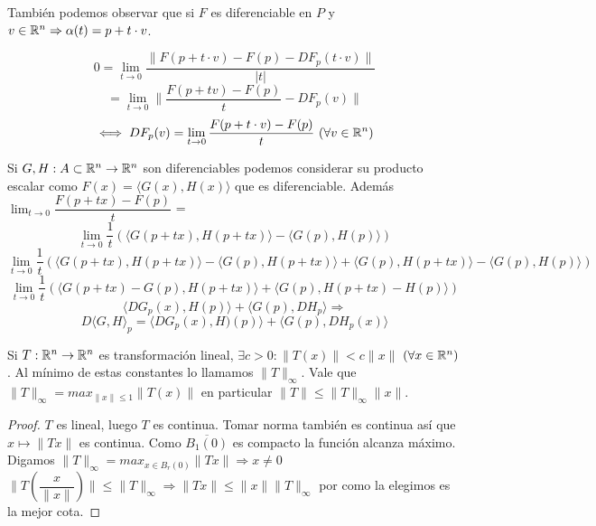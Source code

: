 También podemos observar que si $F$ es diferenciable en $P$ y $v \in \mathbb{R}^n \Rightarrow \alpha(t) = p + t \cdot v$.

\begin{equation}
  0 = \lim_{t \to 0} \dfrac{\| F(p + t \cdot v) - F(p) - DF_p(t \cdot v) \|}{|t|} 
\end{equation}
\begin{equation}
  = \lim_{t \to 0} \| \dfrac{F(p + tv) - F(p)}{t} - DF_p(v) \| 
\end{equation}
\begin{equation}
  \iff DF_p(v) = \lim_{t \to 0} \dfrac{F(p+t \cdot v) - F(p)}{t} \text{  } (\forall v \in \mathbb{R}^n)
\end{equation}

\begin{note}
  Si $G, H: A \subset \mathbb{R}^n \to \mathbb{R}^n$ son diferenciables podemos considerar su producto escalar como $F(x) = \langle G(x), H(x) \rangle$ que es diferenciable.
  Además $\lim_{t \to 0} \dfrac{F(p + tx) - F(p)}{t}$ = \begin{equation}
    \lim_{t \to 0} \dfrac{1}{t} ( \langle G(p + tx), H(p+tx) \rangle - \langle G(p), H(p) \rangle )
  \end{equation}
  \begin{equation}
    \lim_{t \to 0} \dfrac{1}{t} ( \langle G(p+tx), H(p+tx) \rangle - \langle G(p), H(p+tx) \rangle + \langle G(p), H(p+tx) \rangle - \langle G(p), H(p) \rangle)
  \end{equation}
  \begin{equation}
    \lim_{t \to 0} \dfrac{1}{t} (\langle G(p+tx) - G(p), H(p + tx) \rangle + \langle G(p), H(p+tx) - H(p) \rangle) 
  \end{equation}
  \begin{equation}
    \langle DG_p(x), H(p) \rangle + \langle G(p), DH_p \rangle \Rightarrow
  \end{equation}
  \begin{equation}
    D\langle G, H \rangle_p = \langle DG_p(x), H)(p) \rangle + \langle G(p), DH_p(x) \rangle
  \end{equation}
\end{note}

\begin{lemma}
  Si $T: \mathbb{R}^n \to \mathbb{R}^n$ es transformación lineal, $\exists c > 0: \|T(x)\| < c \|x\|$ $(\forall x \in \mathbb{R}^n)$. Al mínimo de estas constantes lo llamamos $\|T\|_{\infty}$. Vale que $\|T\|_{\infty} = max_{\|x\| \leq 1} \|T(x)\|$ en particular
  $\|T\| \leq \|T\|_{\infty} \|x\|$.
  \begin{proof}
    $T$ es lineal, luego $T$ es continua. Tomar norma también es continua así que $x \mapsto \|Tx\|$ es continua. Como $\overline{B_1(0)}$ es compacto la función alcanza máximo. Digamos $\|T\|_{\infty} = max_{x \in B_r(0)} \|Tx\| \Rightarrow x \neq 0$ \\
    $\|T(\dfrac{x}{\|x\|})\| \leq \|T\|_{\infty} \Rightarrow \|Tx\| \leq \|x\| \|T\|_{\infty}$ por como la elegimos es la mejor cota.
  \end{proof}
\end{lemma}


